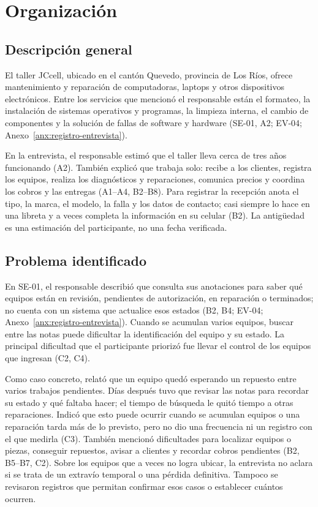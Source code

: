 \section{Organizaci\'on}\label{sec:organizacion}

\subsection{Descripci\'on general}
El taller JC\textbar{}cell, ubicado en el cant\'on Quevedo, provincia de Los R\'ios, ofrece
mantenimiento y reparaci\'on de computadoras, laptops y otros dispositivos electr\'onicos.
Entre los servicios que mencion\'o el responsable est\'an el formateo, la instalaci\'on de
sistemas operativos y programas, la limpieza interna, el cambio de componentes y la soluci\'on
de fallas de software y hardware (SE-01, A2; EV-04; Anexo~\ref{anx:registro-entrevista}).

En la entrevista, el responsable estim\'o que el taller lleva cerca de tres a\~nos funcionando
(A2). Tambi\'en explic\'o que trabaja solo: recibe a los clientes, registra los equipos, realiza
los diagn\'osticos y reparaciones, comunica precios y coordina los cobros y las entregas (A1--A4,
B2--B8). Para registrar la recepci\'on anota el tipo, la marca, el modelo, la falla y los datos
de contacto; casi siempre lo hace en una libreta y a veces completa la informaci\'on en su
celular (B2). La antig\"uedad es una estimaci\'on del participante, no una fecha verificada.


\subsection{Problema identificado}
En SE-01, el responsable describi\'o que consulta sus anotaciones para saber qu\'e equipos est\'an
en revisi\'on, pendientes de autorizaci\'on, en reparaci\'on o terminados; no cuenta con un sistema
que actualice esos estados (B2, B4; EV-04; Anexo~\ref{anx:registro-entrevista}). Cuando se
acumulan varios equipos, buscar entre las notas puede dificultar la identificaci\'on del equipo y
su estado. La principal dificultad que el participante prioriz\'o fue llevar el control de los
equipos que ingresan (C2, C4).

Como caso concreto, relat\'o que un equipo qued\'o esperando un repuesto entre varios trabajos
pendientes. D\'ias despu\'es tuvo que revisar las notas para recordar su estado y qu\'e faltaba hacer;
el tiempo de b\'usqueda le quit\'o tiempo a otras reparaciones. Indic\'o que esto puede ocurrir
cuando se acumulan equipos o una reparaci\'on tarda m\'as de lo previsto, pero no dio una frecuencia
ni un registro con el que medirla (C3). Tambi\'en mencion\'o dificultades para localizar equipos o
piezas, conseguir repuestos, avisar a clientes y recordar cobros pendientes (B2, B5--B7, C2).
Sobre los equipos que a veces no logra ubicar, la entrevista no aclara si se trata de un extrav\'io
temporal o una p\'erdida definitiva. Tampoco se revisaron registros que permitan confirmar esos
casos o establecer cu\'antos ocurren.


